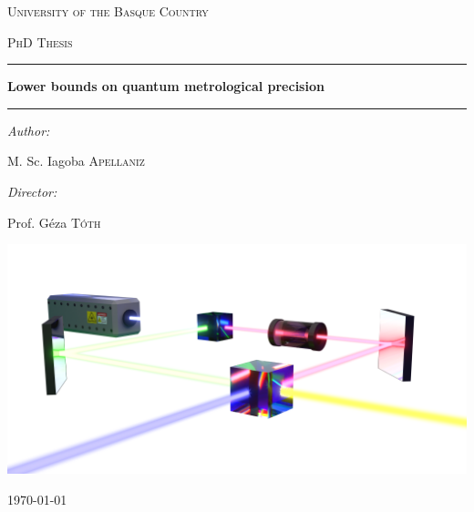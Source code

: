 

\begin{center}

\vspace*{20pt}
\textsc{\LARGE University of the Basque Country}

\vspace{20pt}
\textsc{\Large PhD Thesis}

\vspace{50pt}
\hrule

\vspace{16pt}
{\huge \bfseries Lower bounds on quantum metrological precision}
\vspace{16pt}

\hrule
\vspace{40pt}

\begin{minipage}{0.4\textwidth}
\begin{flushleft} \large
\emph{Author:}


M. Sc. Iagoba \textsc{Apellaniz}
\end{flushleft}
\end{minipage}
\begin{minipage}{0.4\textwidth}
\begin{flushright} \large
\emph{Director:}

Prof. G\'eza \textsc{T\'oth} %
\end{flushright}
\end{minipage}

\vspace{40pt}
\includegraphics[width=0.8\hsize]{img/0-cover3Dpicture.png}
\vfill

{\large \today}

\end{center}

\cleardoublepage
